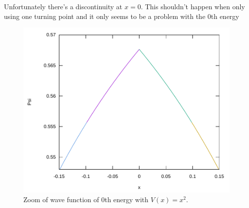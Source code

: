 \documentclass[11pt,DIV=10,final]{scrreprt} %
\begin{document}
\begin{minipage}{\textwidth}
Unfortunately there's a discontinuity at $x = 0$. This shouldn't happen when only using one
turning point and it only seems to be a problem with the 0th energy
\begin{figure}[H]
  \centering
  \includegraphics[width=\textwidth]{plots/square-0-zoom.pdf}
  \caption{Zoom of wave function of 0th energy with $V(x) = x^{2}$.}
\end{figure}
\end{minipage}
\end{document}

